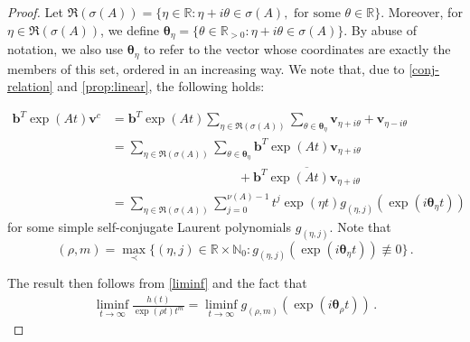 \begin{proof}
  Let
  $\Re(\sigma(A))=\lbrace \eta\in\mathbb{R}:
  \eta+i\theta\in\sigma(A),\mbox{ for some }\theta\in\mathbb{R}
  \rbrace$. Moreover, for $\eta\in\Re(\sigma(A))$, we define
  $\boldsymbol{\theta}_{\eta}=\lbrace \theta\in\mathbb{R}_{>0}:
  \eta+i\theta \in\sigma(A) \rbrace$. By abuse of notation, we also
  use $\boldsymbol{\theta}_{\eta}$ to refer to the vector whose
  coordinates are exactly the members of this set, ordered in an
  increasing way. We note that, due to \cref{conj-relation}
  and \cref{prop:linear}, the
  following holds:

\begin{align*}
\boldsymbol{b}^{T}\exp(At)\boldsymbol{v}^{c} &= \boldsymbol{b}^{T} \exp(At) \sum\limits_{\eta\in\Re(\sigma(A))} \sum\limits_{\theta\in\boldsymbol{\theta}_{\eta}} \boldsymbol{v}_{\eta+i\theta}+\boldsymbol{v}_{\eta-i\theta} \\
&= \sum\limits_{\eta\in\Re(\sigma(A))} \sum\limits_{\theta\in\boldsymbol{\theta}_{\eta}} \boldsymbol{b}^{T} \exp(At) \boldsymbol{v}_{\eta+i\theta} \\
& \qquad \qquad \qquad \qquad \qquad + \overline{\boldsymbol{b}^{T} \exp(At) \boldsymbol{v}_{\eta+i\theta}} \\
& = \sum\limits_{\eta\in\Re(\sigma(A))} \sum\limits_{j=0}^{\nu(A)-1} t^{j}\exp(\eta t)  g_{(\eta,j)}( \exp(i\boldsymbol{\theta}_{\eta}t) )
\end{align*}
for some simple self-conjugate Laurent polynomials
$g_{(\eta,j)}$.
Note that
\begin{equation*}
(\rho,m)=\max\limits_{\prec} \lbrace (\eta,j)\in\mathbb{R}\times
\mathbb{N}_{0}: g_{(\eta,j)}(\exp(i\boldsymbol{\theta}_{\eta} t)) \not
\equiv 0 \rbrace \, .
\end{equation*}

The result then follows from \cref{liminf} and the fact
that
\begin{align*}
\liminf\limits_{t\rightarrow\infty} \frac{h(t)}{\exp(\rho t)t^{m}}=
  \liminf\limits_{t\rightarrow\infty}
  g_{(\rho,m)}(\exp(i\boldsymbol{\theta}_{\rho} t)) \, .
\end{align*}
\end{proof}
